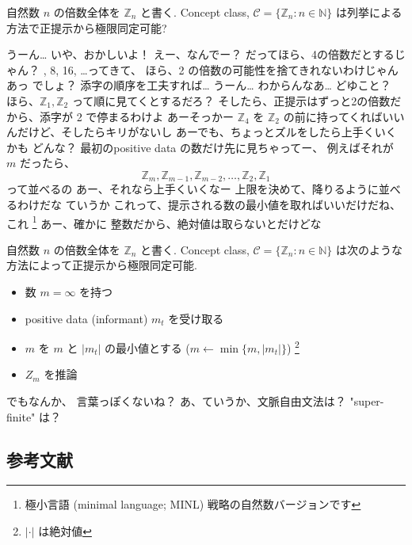 \begin{boxnote}
    自然数 $n$ の倍数全体を $\mathbb{Z}_n$ と書く.
    Concept class, $\mathcal{C} = \{ \mathbb{Z}_n : n \in \mathbb{N} \}$ は列挙による方法で正提示から極限同定可能?
\end{boxnote}

\YUZUKO うーん…
\YUZUKO いや、おかしいよ！
\YUKARI えー、なんでー？
\YUZUKO だってほら、4の倍数だとするじゃん？
, 8, 16, \ldots ってきて、
\YUZUKO ほら、2 の倍数の可能性を捨てきれないわけじゃん
\YUI あっ
\YUZUKO でしょ？
\YUI 添字の順序を工夫すれば… うーん… わからんなあ…
\YUKARI どゆこと？
\YUI ほら、$\mathbb{Z}_1, \mathbb{Z}_2$ って順に見てくとするだろ？
\YUI そしたら、正提示はずっと2の倍数だから、添字が 2 で停まるわけよ
\YUKARI あーそっかー
\YUI $\mathbb{Z}_4$ を $\mathbb{Z}_2$ の前に持ってくればいいんだけど、そしたらキリがないし
\YUKARI あーでも、ちょっとズルをしたら上手くいくかも
\YUI どんな？
\YUKARI 最初のpositive data の数だけ先に見ちゃってー、
\YUKARI 例えばそれが $m$ だったら、
$$\mathbb{Z}_{m}, \mathbb{Z}_{m-1}, \mathbb{Z}_{m-2}, \ldots, \mathbb{Z}_{2}, \mathbb{Z}_{1}$$
\YUKARI って並べるの
\YUI あー、それなら上手くいくなー
\YUI 上限を決めて、降りるように並べるわけだな
\YUZUKO ていうか
\YUZUKO これって、提示される数の最小値を取ればいいだけだね、これ \footnote{極小言語 (minimal language; MINL) 戦略の自然数バージョンです}
\YUKARI あー、確かに
\YUI 整数だから、絶対値は取らないとだけどな


\begin{boxnote}
    自然数 $n$ の倍数全体を $\mathbb{Z}_n$ と書く.
    Concept class, $\mathcal{C} = \{ \mathbb{Z}_n : n \in \mathbb{N} \}$ は次のような方法によって正提示から極限同定可能.

    \begin{itemize}
        \item 数 $m = \infty$ を持つ
        \item positive data (informant) $m_t$ を受け取る
        \item $m$ を $m$ と $|m_t|$ の最小値とする ($m \leftarrow \min \{ m, |m_t| \}$) \footnote{$|\cdot|$ は絶対値}
        \item $Z_m$ を推論
    \end{itemize}
\end{boxnote}

\PAUSE

\YUKARI でもなんか、
\YUKARI 言葉っぽくないね？
\YUI あ、ていうか、文脈自由文法は？ "super-finite" は？

\subsection*{参考文献}

